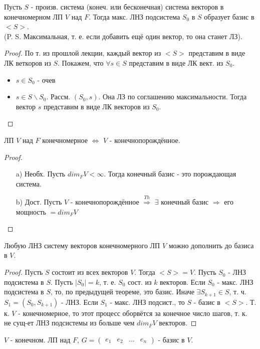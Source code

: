 \begin{theorem}
Пусть $S$ - произв. система (конеч. или бесконечная) система векторов в конечномерном ЛП $V$ над $F$. Тогда макс. ЛНЗ подсистема $S_0$ в $S$ образует базис в $<S>$. \\
(P. S. Максимальная, т. е. если добавить ещё один вектор, то она станет ЛЗ).
\end{theorem}
\begin{proof}
По т. из прошлой лекции, каждый вектор из $<S>$ представим в виде ЛК веткоров из $S$. Покажем, что $\forall s \in S$ представим в виде ЛК вект. из $S_0$.
\begin{itemize}
  \item $s \in S_0$ - очев
  \item $s \in S \backslash S_0$. Рассм. $(S_0, s)$. Она ЛЗ по соглашению максимальности. Тогда вектор $s$ представим в виде ЛК векторов из $S_0$.
\end{itemize}
\end{proof}
\begin{consequence}
ЛП $V$ над $F$ конечномерное $\iff$ $V$ - конечнопорождённое.
\end{consequence}
\begin{proof}
\begin{itemize}
  \item [a) ] Необх. Пусть $dim_F V < \infty$. Тогда конечный базис - это порождающая система.
  \item [b) ] Дост. Пусть $V$ - конечнопорождённое $\overset{Th}{\Rightarrow}$ $\exists$ конечный базис $\Rightarrow$ его мощность $= dim_F V$
\end{itemize}
\end{proof}
\begin{theorem}
Любую ЛНЗ систему векторов конечномерного ЛП $V$ можно дополнить до базиса в $V$. 
\end{theorem}
\begin{proof}
Пусть $S$ состоит из всех векторов $V$. Тогда $<S> = V$. Пусть $S_0$ - ЛНЗ подсистема в $S$. Пусть $\left|S_0\right| = k$, т. е. $S_0$ сост. из $k$ векторов. Если $S_0$ - макс. ЛНЗ подсистема в $S$, то, по предыдущей теореме, это базис. Иначе $\exists S_{k + 1} \in S$, т. ч. $S_1 = (S_0, S_{k + 1})$ - ЛНЗ. Если $S_1$ - макс. ЛНЗ подсист., то $S$ - базис в $<S>$. Т. к. $V$ - конечномерное, то этот процесс оборвётся за конечное число шагов, т. к. не сущ-ет ЛНЗ подсистемы из больше чем $dim_F V$ векторов.
\end{proof}
$V$ - конечном. ЛП над $F$, $G = \begin{pmatrix} e_1 & e_2 & \ldots & e_n \end{pmatrix}$ - базис в $V$. \\
